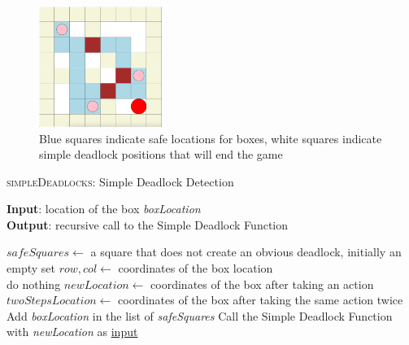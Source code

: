 \documentclass{article}
\begin{document}
\begin{figure}[htp]
        \centering
        \includegraphics[width=4cm]{Deadlock.png}
        \caption{Blue squares indicate safe locations for boxes, white squares indicate simple deadlock positions that will end the game}
    \end{figure} 

\begin{algorithm}
    \caption{\textsc{simpleDeadlocks}: Simple Deadlock Detection}\label{euclid}
    \hspace*{\algorithmicindent} \textbf{Input}: location of the box \emph{boxLocation} \\
    \hspace*{\algorithmicindent} \textbf{Output}: recursive call to the Simple Deadlock Function \\
    \begin{algorithmic}
    \State $safeSquares \gets$ a square that does not create an obvious deadlock, initially an empty set
    \State $row, col \gets$ coordinates of the box location \\
        \State do nothing
    \EndIf 
        \State $newLocation \gets$ coordinates of the box after taking an action 
        \State $twoStepsLocation \gets$ coordinates of the box after taking the same action twice \\
            \State Add \emph{boxLocation} in the list of \emph{safeSquares} %
            \State Call the Simple Deadlock Function with \emph{newLocation} as \underline{input}
        \EndIf
    \EndFor
    \end{algorithmic}
\end{algorithm}
\newpage
\end{document}
